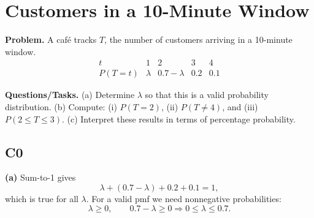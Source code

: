 		\section{Customers in a 10-Minute Window}
		
		\textbf{Problem.}
		A café tracks $T$, the number of customers arriving in a 10-minute window.
		\[
		\begin{array}{c|cccc}
			t & 1 & 2 & 3 & 4\\
			\hline
			P(T=t) & \lambda & 0.7-\lambda & 0.2 & 0.1
		\end{array}
		\]
		
		\textbf{Questions/Tasks.}
		(a) Determine $\lambda$ so that this is a valid probability distribution.
		(b) Compute: (i) $P(T=2)$, (ii) $P(T\ne 4)$, and (iii) $P(2\le T\le 3)$.
		(c) Interpret these results in terms of percentage probability.
		
		\subsection*{C0}

		\textbf{(a)} Sum-to-1 gives
		\[
		\lambda+(0.7-\lambda)+0.2+0.1=1,
		\]
		which is true for all $\lambda$. For a valid pmf we need nonnegative probabilities:
		\[
		\lambda\ge 0,\qquad 0.7-\lambda\ge 0
		\Rightarrow 0\le \lambda\le 0.7.
		\]

